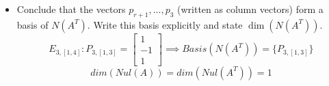 \documentclass[9pt]{article}
\theoremstyle{plain}
\begin{document}
\begin{enumerate}
\begin{itemize}
\[\begin{array}{cccc}
					            2 & 4 & 1 & 3 \\
					            1 & 2 & 1 & 2
				            \end{array}
				            \right] =
			            \left[
				            \begin{array}{c}
					            0 \\ 0 \\ 0 \\ 0
				            \end{array}
				            \right] \quad
		            \]
		            \[
			            \implies A^Tp_3 = 0 \implies
			            \left[
				            \begin{array}{ccc}
					            1 & 2 & 1 \\
					            2 & 4 & 2 \\
					            0 & 1 & 1 \\
					            1 & 3 & 2
				            \end{array}
				            \right]
			            \begin{bmatrix}
				            -1 \\ 2 \\ 1
			            \end{bmatrix} =
			            \left[
				            \begin{array}{c}
					            0 \\ 0 \\ 0 \\ 0
				            \end{array}
				            \right] \quad
		            \]
		      \item[(iii)] Conclude that the vectors $p_{r+1},...,p_{3}$ (written as column vectors) form a basis of $N(A^{T})$. Write this basis explicitly and state $\dim(N(A^{T}))$.
		            \[ E_{3,[1,4]} : P_{3,[1,3]} = \begin{bmatrix} 1 \\ -1 \\ 1 \end{bmatrix} \implies Basis(N(A^T)) = \{ P_{3,[1,3]} \} \]
		            \[ dim(Nul(A)) = dim(Nul(A^T)) = 1 \]
	      \end{itemize}


\end{enumerate}
\end{document}
